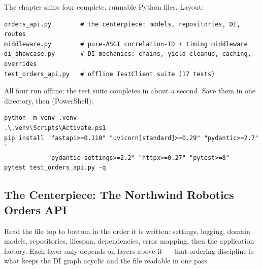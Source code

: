The chapter ships four complete, runnable Python files. Layout:

\begin{verbatim}
orders_api.py        # the centerpiece: models, repositories, DI, routes
middleware.py        # pure-ASGI correlation-ID + timing middleware
di_showcase.py       # DI mechanics: chains, yield cleanup, caching, overrides
test_orders_api.py   # offline TestClient suite (17 tests)
\end{verbatim}

All four run offline; the test suite completes in about a second. Save them
in one directory, then (PowerShell):

\begin{verbatim}
python -m venv .venv
.\.venv\Scripts\Activate.ps1
pip install "fastapi>=0.110" "uvicorn[standard]>=0.29" "pydantic>=2.7" `
            "pydantic-settings>=2.2" "httpx>=0.27" "pytest>=8"
pytest test_orders_api.py -q
\end{verbatim}

\subsection{The Centerpiece: The Northwind Robotics Orders API}
\label{sec:ch6-code-orders}

Read the file top to bottom in the order it is written: settings, logging,
domain models, repositories, lifespan, dependencies, error mapping, then the
application factory. Each layer only depends on layers above it --- that
ordering discipline is what keeps the DI graph acyclic and the file readable
in one pass.

